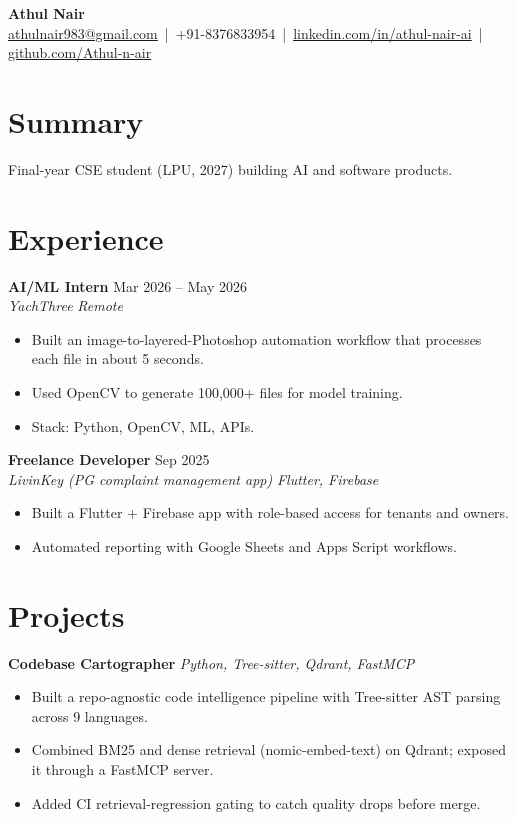 \documentclass[10pt,a4paper]{article}
\newcommand{\role}[4]{\textbf{#1} \hfill #3\\ \textit{#2} \hfill \textit{#4}\par}
\newcommand{\proj}[2]{\textbf{#1} \hfill \textit{#2}\par}
\begin{document}
{\LARGE\bfseries\color{accent} Athul Nair}\\[2pt]
\href{mailto:athulnair983@gmail.com}{athulnair983@gmail.com} \,|\, +91-8376833954 \,|\,
\href{https://linkedin.com/in/athul-nair-ai}{linkedin.com/in/athul-nair-ai} \,|\,
\href{https://github.com/Athul-n-air}{github.com/Athul-n-air}

\section{Summary}
Final-year CSE student (LPU, 2027) building AI and software products. %

\section{Experience}
\role{AI/ML Intern}{YachThree}{Mar 2026 -- May 2026}{Remote}
\begin{itemize}
  \item Built an image-to-layered-Photoshop automation workflow that processes each file in about 5 seconds.
  \item Used OpenCV to generate 100,000+ files for model training.
  \item Stack: Python, OpenCV, ML, APIs.
\end{itemize}

\role{Freelance Developer}{LivinKey (PG complaint management app)}{Sep 2025}{Flutter, Firebase}
\begin{itemize}
  \item Built a Flutter + Firebase app with role-based access for tenants and owners.
  \item Automated reporting with Google Sheets and Apps Script workflows.
\end{itemize}

\section{Projects}
\proj{Codebase Cartographer}{Python, Tree-sitter, Qdrant, FastMCP}
\begin{itemize}
  \item Built a repo-agnostic code intelligence pipeline with Tree-sitter AST parsing across 9 languages.
  \item Combined BM25 and dense retrieval (nomic-embed-text) on Qdrant; exposed it through a FastMCP server.
  \item Added CI retrieval-regression gating to catch quality drops before merge.
\end{itemize}
\end{document}
